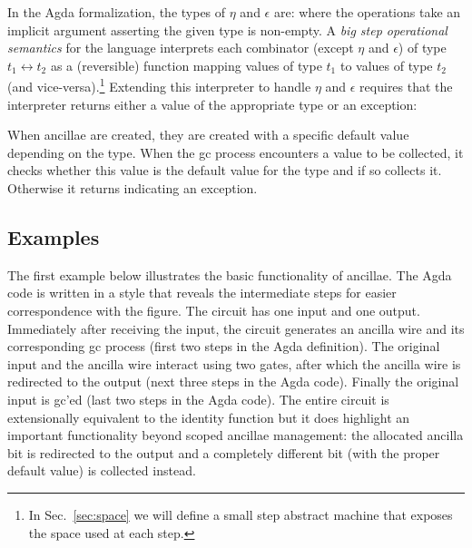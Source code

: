 \documentclass[sigplan,10pt,review,anonymous]{acmart}
\begin{document}
In the Agda formalization, the types of $\eta$ and $\epsilon$ are:
\EtaEpsilon{}
\noindent where the operations take an implicit argument asserting the
given type is non-empty. A \emph{big step operational semantics} for
the language interprets each combinator (except $\eta$ and $\epsilon$)
of type $t_1 \leftrightarrow t_2$ as a (reversible) function mapping
values of type $t_1$ to values of type $t_2$ (and
vice-versa).\footnote{In Sec.~\ref{sec:space} we will define a small
  step abstract machine that exposes the space used at each step.}
Extending this interpreter to handle $\eta$ and $\epsilon$ requires
that the interpreter returns either a value of the appropriate type or an
exception:

\dyninterp{}

When ancillae are created, they are created with a specific default
value depending on the type. When the gc process encounters a value to
be collected, it checks whether this value is the default value for
the type and if so collects it. Otherwise it returns
 indicating an exception.

\subsection{Examples}
\label{sub:id}

The first example below illustrates the basic functionality of
ancillae. The Agda code is written in a style that reveals the
intermediate steps for easier correspondence with the figure. The
circuit has one input and one output. Immediately after receiving the
input, the circuit generates an ancilla wire and its corresponding gc
process (first two steps in the Agda definition). The original input
and the ancilla wire interact using two  gates,
after which the ancilla wire is redirected to the output (next three
steps in the Agda code). Finally the original input is gc'ed (last two
steps in the Agda code). The entire circuit is extensionally
equivalent to the identity function but it does highlight an important
functionality beyond scoped ancillae management: the allocated ancilla
bit is redirected to the output and a completely different bit (with
the proper default value) is collected instead.

\begin{center}

\end{center}

\vspace{-\baselineskip}
\end{document}

